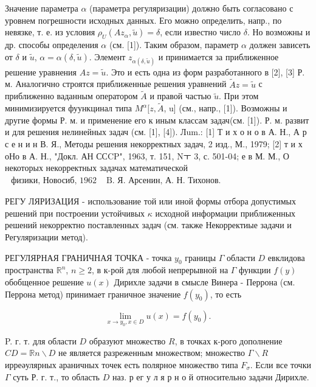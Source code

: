 \documentclass[10pt]{article}
\begin{document}
Значение параметра $\alpha$ (параметра регуляризации) должно быть согласовано с уровнем погрешности исходных данных. Его можно определить, напр., по невязке, т. е. из условия $\rho_{U}\left(A z_{\alpha}, \tilde{u}\right)=\delta$, если известно число $\delta$. Но возможны и др. способы определения $\alpha$ (см. [1]). Таким образом, параметр $\alpha$ должен зависеть от $\delta$ и $\tilde{u}$, $\alpha=\alpha(\delta, \tilde{u})$. Элемент $z_{\alpha(\delta, \tilde{u})}$ и принимается за приближенное решение уравнения $A z=\tilde{u}$. Это и есть одна из форм разработанного в [2], [3] Р. м. Аналогично строятся приближенные решения уравнений $\tilde{A} z=\tilde{u}$ с приближенно ваданным оператором $\tilde{A}$ и правой частью $\tilde{u}$. При этом минимизируется фуункцинал типа $M^{\alpha}[z, \tilde{A}$, u] (см., напр., [1]). Возможны и другие формы Р. м. и применение его к иным классам задач(см. [1]). Р. м. развит и для решения нелинейных задач (см. [1], [4]). Лum.: [1] Т и х о н о в А. Н., А р с е н и н В. Я., Методы решения некорректных задач, 2 изд., М., 1979; [2] т и х оНо в А. Н., "Докл. АН ССCP", 1963, т. 151, Nㅜ 3, с. 501-04; е в М. М., О некоторых некорректных задачах математической $\begin{array}{ll}\text { физики, Новосиб, } 1962 & \text { B. Я. Арсенин, А. Н. Тихонов. }\end{array}$



РЕГУ ЛЯРИЗАЦИЯ - использование той или иной формы отбора допустимых решений при построении устойчивых $\kappa$ исходной информации приближенных решений некорректно поставленных задач (см. также Некорректиые задачи и Регуляризации метод).



РЕГУЛЯРНАЯ ГРАНИЧНАЯ ТОЧКА - точка $y_{0}$ границы $\Gamma$ области $D$ евклидова пространства $\mathbb{R}^{n}$, $n \geqslant 2$, в к-рой для любой непрерывной на $\Gamma$ функции $f(y)$ обобщенное решение $u(x)$ Дирихле задачи в смысле Винера - Перрона (см. Перрона метод) принимает граничное значение $f\left(y_{0}\right)$, то есть



\[

\lim _{x \rightarrow y_{0}, x \in D} u(x)=f\left(y_{0}\right) .

\]



P. г. т. для области $D$ образуют множество $R$, в точках к-рого дополнение $C D=\mathbb{R} n \backslash D$ не является разреженным множеством; множество $\Gamma \backslash R$ ирреәулярных араничных точек есть полярное множество типа $F_{\sigma}$. Если все точки $\Gamma$ суть Р. г. т., то область $D$ наз. р ег у л я р н о й относительно задачи Дирихле.
\end{document}
